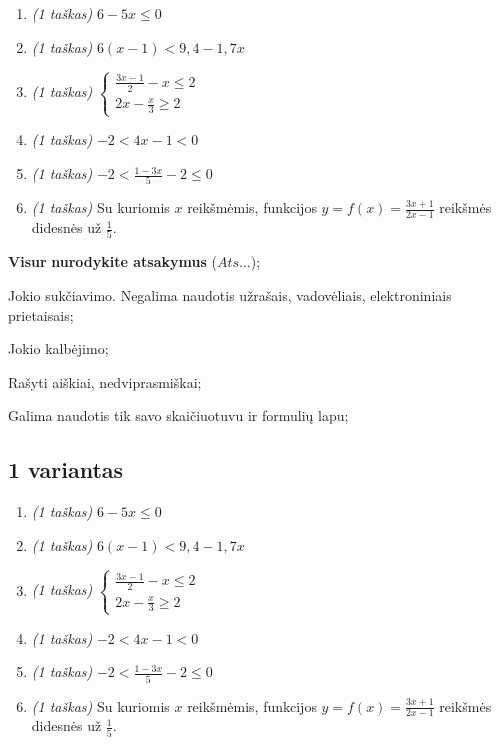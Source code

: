 \documentclass[a4paper]{article}
\begin{document}
\begin{enumerate}
      \item \textit{(1 taškas)} $6-5x \leqslant 0$
      \item \textit{(1 taškas)} $6(x-1) < 9,4 - 1,7x$
      \item \textit{(1 taškas)}
      \(
      \left\{\begin{matrix}
            \frac{3x-1}{2}-x \leqslant 2 \\
            2x - \frac{x}{3} \geqslant 2
      \end{matrix}\right.
      \)
      \item \textit{(1 taškas)} $-2<4x-1<0$
      \item \textit{(1 taškas)} $-2 < \frac{1-3x}{5}-2 \leqslant 0$
      \item \textit{(1 taškas)} Su kuriomis $x$ reikšmėmis, funkcijos $y=f(x)=\frac{3x+1}{2x-1}$ reikšmės didesnės už $\frac{1}{5}$.
\end{enumerate}

\begin{small}
      \begin{enumerate*}[label={(\arabic*)}]
            \item \textbf{Visur} \textbf{nurodykite atsakymus} ($Ats\ldots$);
            \item Jokio sukčiavimo. Negalima naudotis užrašais, vadovėliais,
            elektroniniais prietaisais;
            \item Jokio kalbėjimo;
            \item Rašyti aiškiai, nedviprasmiškai;
            \item Galima naudotis tik savo skaičiuotuvu ir formulių lapu;
      \end{enumerate*}
\end{small}

\vspace*{3mm}

\subsection*{1 variantas}

\begin{enumerate}
      \item \textit{(1 taškas)} $6-5x \leqslant 0$
      \item \textit{(1 taškas)} $6(x-1) < 9,4 - 1,7x$
      \item \textit{(1 taškas)}
      \(
      \left\{\begin{matrix}
            \frac{3x-1}{2}-x \leqslant 2 \\
            2x - \frac{x}{3} \geqslant 2
      \end{matrix}\right.
      \)
      \item \textit{(1 taškas)} $-2<4x-1<0$
      \item \textit{(1 taškas)} $-2 < \frac{1-3x}{5}-2 \leqslant 0$
      \item \textit{(1 taškas)} Su kuriomis $x$ reikšmėmis, funkcijos $y=f(x)=\frac{3x+1}{2x-1}$ reikšmės didesnės už $\frac{1}{5}$.
\end{enumerate}
\end{document}

